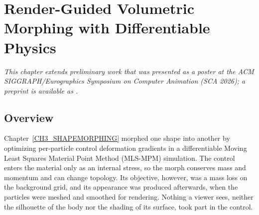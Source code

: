 
\clearpage %
\chapter{Render-Guided Volumetric Morphing with Differentiable Physics}\label{CH4_PhysMorphGS}

\noindent\textit{This chapter extends preliminary work that was presented as a poster at the ACM SIGGRAPH/Eurographics
Symposium on Computer Animation (SCA 2026); a preprint is available as \citet{song2025physmorphgs}.}
\setlength{\emergencystretch}{1.5em}

\section{Overview}
\label{ch4:sec_overview}

Chapter~\ref{CH3_SHAPEMORPHING} morphed one shape into another by optimizing per-particle control deformation
gradients in a differentiable Moving Least Squares Material Point Method (MLS-MPM) simulation. The control enters the material only as an internal stress, so the
morph conserves mass and momentum and can change topology. Its objective, however, was a mass loss on the background
grid, and its appearance was produced afterwards, when the particles were meshed and smoothed for rendering. Nothing a
viewer sees, neither the silhouette of the body nor the shading of its surface, took part in the control.

